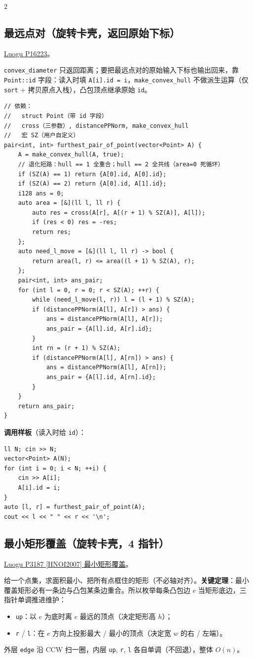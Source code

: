 \begin{multicols*}{2}
		\subsection{最远点对（旋转卡壳，返回原始下标）}

		\href{https://www.luogu.com.cn/problem/P16223}{Luogu P16223}。

		\texttt{convex\_diameter} 只返回距离；要把最远点对的原始输入下标也输出回来，靠 \texttt{Point::id} 字段：读入时填 \texttt{A[i].id = i}，\texttt{make\_convex\_hull} 不做派生运算（仅 \texttt{sort} + 拷贝原点入栈），凸包顶点继承原始 \texttt{id}。

		\begin{verbatim}
// 依赖：
//   struct Point（带 id 字段）
//   cross（三参数）, distancePPNorm, make_convex_hull
//   宏 SZ（用户自定义）
pair<int, int> furthest_pair_of_point(vector<Point> A) {
	A = make_convex_hull(A, true);
	// 退化短路：hull == 1 全重合；hull == 2 全共线（area=0 死循环）
	if (SZ(A) == 1) return {A[0].id, A[0].id};
	if (SZ(A) == 2) return {A[0].id, A[1].id};
	i128 ans = 0;
	auto area = [&](ll l, ll r) {
		auto res = cross(A[r], A[(r + 1) % SZ(A)], A[l]);
		if (res < 0) res = -res;
		return res;
	};
	auto need_l_move = [&](ll l, ll r) -> bool {
		return area(l, r) <= area((l + 1) % SZ(A), r);
	};
	pair<int, int> ans_pair;
	for (int l = 0, r = 0; r < SZ(A); ++r) {
		while (need_l_move(l, r)) l = (l + 1) % SZ(A);
		if (distancePPNorm(A[l], A[r]) > ans) {
			ans = distancePPNorm(A[l], A[r]);
			ans_pair = {A[l].id, A[r].id};
		}
		int rn = (r + 1) % SZ(A);
		if (distancePPNorm(A[l], A[rn]) > ans) {
			ans = distancePPNorm(A[l], A[rn]);
			ans_pair = {A[l].id, A[rn].id};
		}
	}
	return ans_pair;
}
		\end{verbatim}

		\textbf{调用样板}（读入时给 \texttt{id}）：
		\begin{verbatim}
ll N; cin >> N;
vector<Point> A(N);
for (int i = 0; i < N; ++i) {
	cin >> A[i];
	A[i].id = i;
}
auto [l, r] = furthest_pair_of_point(A);
cout << l << " " << r << '\n';
		\end{verbatim}

		\subsection{最小矩形覆盖（旋转卡壳，4 指针）}

		\href{https://vjudge.net/problem/Luogu-P3187}{Luogu P3187 [HNOI2007] 最小矩形覆盖}。

		给一个点集，求面积最小、把所有点框住的矩形（不必轴对齐）。\textbf{关键定理}：最小覆盖矩形必有一条边与凸包某条边重合。所以枚举每条凸包边 $e$ 当矩形底边，三指针单调推进维护：
		\begin{itemize}
				\setlength\itemsep{0pt}
			\item \texttt{up}：以 $e$ 为底时离 $e$ 最远的顶点（决定矩形高 $h$）；
			\item \texttt{r} / \texttt{l}：在 $e$ 方向上投影最大 / 最小的顶点（决定宽 $w$ 的右 / 左端）。
		\end{itemize}
		外层 \texttt{edge} 沿 CCW 扫一圈，内层 \texttt{up}, \texttt{r}, \texttt{l} 各自单调（不回退），整体 $O(n)$。


\end{multicols*}
